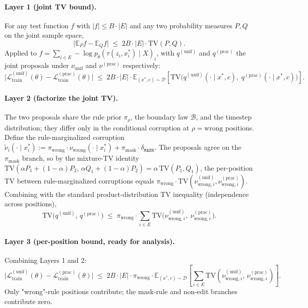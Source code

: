 \documentclass{llmxive}
\providecommand{\xstar}{x^{\ast}}
\providecommand{\mask}{\texttt{MASK}}
\providecommand{\Ltrain}{\mathcal{L}_{\mathrm{train}}}
\providecommand{\TV}[2]{\mathrm{TV}\!\left(#1,\,#2\right)}
\begin{document}
\paragraph{Layer 1 (joint TV bound).}
For any test function $f$ with $|f| \leq B \cdot |E|$ and any two probability measures $P, Q$ on the joint sample space,
\[
\big|\mathbb{E}_P f - \mathbb{E}_Q f\big| \;\leq\; 2 B \cdot |E| \cdot \mathrm{TV}(P, Q).
\]
Applied to $f = \sum_{i \in E} -\log p_\theta(\tau(z_i, \xstar_i) \mid X)_i$, with $q^{(\mathrm{unif})}$ and $q^{(\mathrm{prac})}$ the joint proposals under $\nu_{\mathrm{unif}}$ and $\nu^{(\mathrm{prac})}$ respectively:
\[
\big|\Ltrain^{(\mathrm{unif})}(\theta) - \Ltrain^{(\mathrm{prac})}(\theta)\big| \;\leq\; 2B \cdot |E| \cdot \mathbb{E}_{(\xstar, c) \sim \mathcal{D}}\!\left[\mathrm{TV}\!\big(q^{(\mathrm{unif})}(\cdot \mid \xstar, c),\; q^{(\mathrm{prac})}(\cdot \mid \xstar, c)\big)\right].
\]

\paragraph{Layer 2 (factorize the joint TV).}
The two proposals share the rule prior $\pi_\rho$, the boundary law $\mathcal{B}$, and the timestep distribution; they differ only in the conditional corruption at $\rho = \mathrm{wrong}$ positions. Define the rule-marginalized corruption $\tilde{\nu}_i(\cdot \mid \xstar_i) := \pi_{\mathrm{wrong}} \cdot \nu_{\mathrm{wrong}}(\cdot \mid \xstar_i) + \pi_{\mathrm{mask}} \cdot \delta_{\mask}$. The proposals agree on the $\pi_{\mathrm{mask}}$ branch, so by the mixture-TV identity $\mathrm{TV}(\alpha P_1 + (1-\alpha) P_2,\, \alpha Q_1 + (1-\alpha) P_2) = \alpha \,\mathrm{TV}(P_1, Q_1)$, the per-position TV between rule-marginalized corruptions equals $\pi_{\mathrm{wrong}} \cdot \mathrm{TV}(\nu^{(\mathrm{unif})}_{\mathrm{wrong}, i}, \nu^{(\mathrm{prac})}_{\mathrm{wrong}, i})$. Combining with the standard product-distribution TV inequality (independence across positions),
\[
\mathrm{TV}\!\big(q^{(\mathrm{unif})},\, q^{(\mathrm{prac})}\big) \;\leq\; \pi_{\mathrm{wrong}} \cdot \sum_{i \in E} \mathrm{TV}\!\big(\nu^{(\mathrm{unif})}_{\mathrm{wrong}, i},\; \nu^{(\mathrm{prac})}_{\mathrm{wrong}, i}\big).
\]

\paragraph{Layer 3 (per-position bound, ready for analysis).}
Combining Layers 1 and 2:
\begin{equation}
\big|\Ltrain^{(\mathrm{unif})}(\theta) - \Ltrain^{(\mathrm{prac})}(\theta)\big| \;\leq\; 2B \cdot |E| \cdot \pi_{\mathrm{wrong}} \cdot \mathbb{E}_{(\xstar, c) \sim \mathcal{D}}\!\left[\sum_{i \in E} \TV{\nu^{(\mathrm{unif})}_{\mathrm{wrong}, i}}{\nu^{(\mathrm{prac})}_{\mathrm{wrong}, i}}\right].
\label{eq:topk-tv-bound}
\end{equation}
Only "wrong"-rule positions contribute; the mask-rule and non-edit branches contribute zero.
\end{document}

